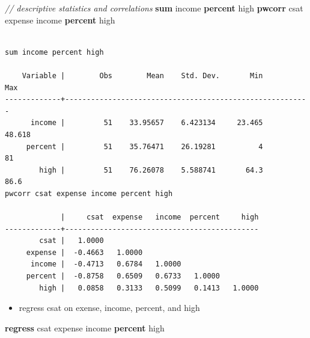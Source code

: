 \documentclass[]{book}
\newenvironment{Shaded}{\begin{snugshade}}{\end{snugshade}}
\newcommand{\CommentTok}[1]{\textcolor[rgb]{0.56,0.35,0.01}{\textit{#1}}}
\newcommand{\KeywordTok}[1]{\textcolor[rgb]{0.13,0.29,0.53}{\textbf{#1}}}
\newcommand{\NormalTok}[1]{#1}
\providecommand{\tightlist}{%
  \setlength{\itemsep}{0pt}\setlength{\parskip}{0pt}}
\begin{document}
\begin{Shaded}
\begin{Highlighting}[]
  \CommentTok{// descriptive statistics and correlations}
  \KeywordTok{sum}\NormalTok{ income }\KeywordTok{percent}\NormalTok{ high}
  \KeywordTok{pwcorr}\NormalTok{ csat expense income }\KeywordTok{percent}\NormalTok{ high}
\end{Highlighting}
\end{Shaded}

\begin{verbatim}

sum income percent high

    Variable |        Obs        Mean    Std. Dev.       Min        Max
-------------+---------------------------------------------------------
      income |         51    33.95657    6.423134     23.465     48.618
     percent |         51    35.76471    26.19281          4         81
        high |         51    76.26078    5.588741       64.3       86.6
pwcorr csat expense income percent high

             |     csat  expense   income  percent     high
-------------+---------------------------------------------
        csat |   1.0000 
     expense |  -0.4663   1.0000 
      income |  -0.4713   0.6784   1.0000 
     percent |  -0.8758   0.6509   0.6733   1.0000 
        high |   0.0858   0.3133   0.5099   0.1413   1.0000
\end{verbatim}

\begin{itemize}
\tightlist
\item
  regress csat on exense, income, percent, and high
\end{itemize}

\begin{Shaded}
\begin{Highlighting}[]
  \KeywordTok{regress}\NormalTok{ csat expense income }\KeywordTok{percent}\NormalTok{ high}
\end{Highlighting}
\end{Shaded}
\end{document}
